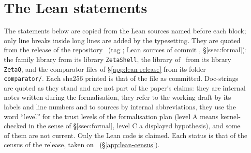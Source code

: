 \section{The Lean statements}\label{app:lean}
\sloppy
The statements below are copied from the Lean sources named before each block; only line breaks inside long lines are added by the
typesetting. They are quoted from the release of the repository \repourl\ (tag \repotag; Lean sources of commit \relcommit, \S\ref{ssec:formal}): the
family library from its library \texttt{ZetaShell}, the library of~\cite{DSouza} from its library \texttt{ZetaQ}, and the comparator files of
\S\ref{app:lean-release} from its folder \texttt{comparator/}. Each sha256 printed is that of the file as committed. Doc-strings are quoted as they
stand and are not part of the paper's claims: they are internal notes written during the formalisation, they refer to the working draft by its
labels and line numbers and to sources by internal abbreviations, they use the word ``level'' for the trust levels of the formalisation plan
(level A means kernel-checked in the sense of \S\ref{ssec:formal}, level C a displayed hypothesis), and some of them are not current. Only the Lean
code is claimed. Each status is that of the census of the release, taken on \censusref\ (\S\ref{app:lean-census}).

